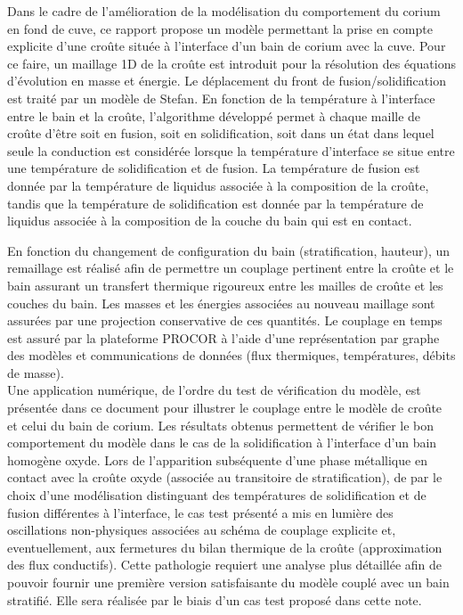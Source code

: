 Dans le cadre de l'amélioration de la modélisation du comportement du corium en fond de cuve, ce rapport propose un modèle permettant la prise en compte explicite d'une croûte située à l'interface d'un bain de corium avec la cuve. Pour ce faire, un maillage 1D de la croûte est introduit pour la résolution des équations d'évolution en masse et énergie. Le déplacement du front de fusion/solidification est traité par un modèle de Stefan. En fonction de la température à l'interface entre le bain et la croûte, l'algorithme développé permet à chaque maille de croûte d'être soit en fusion, soit en solidification, soit dans un état dans lequel seule la conduction est considérée lorsque la température d'interface se situe entre une température de solidification et de fusion. La température de fusion est donnée par la température de liquidus associée à la composition de la croûte, tandis que la température de solidification est donnée par la température de liquidus associée à la composition de la couche du bain qui est en contact. 

En fonction du changement de configuration du bain (stratification, hauteur), un remaillage est réalisé afin de permettre un couplage pertinent entre la croûte et le bain assurant un transfert thermique rigoureux entre les mailles de croûte et les couches du bain. Les masses et les énergies associées au nouveau maillage sont assurées par une projection conservative de ces quantités. Le couplage en temps est assuré par la plateforme PROCOR à l'aide d'une représentation par graphe des modèles et communications de données (flux thermiques, températures, débits de masse).\\

Une application numérique, de l'ordre du test de vérification du modèle, est présentée dans ce document pour illustrer le couplage entre le modèle de croûte et celui du bain de corium. Les résultats obtenus permettent de vérifier le bon comportement du modèle dans le cas de la solidification à l'interface d'un bain homogène oxyde. Lors de l'apparition  subséquente d'une phase métallique en contact avec la croûte oxyde (associée au transitoire de stratification), de par le choix d'une modélisation distinguant des températures de solidification et de fusion différentes à l'interface, le cas test présenté a mis en lumière des oscillations non-physiques associées au schéma de couplage explicite et, eventuellement, aux fermetures du bilan thermique de la croûte (approximation des flux conductifs). Cette pathologie requiert une analyse plus détaillée afin de pouvoir fournir une première version satisfaisante du modèle couplé avec un bain stratifié. Elle sera réalisée par le biais d'un cas test proposé dans cette note. \\

